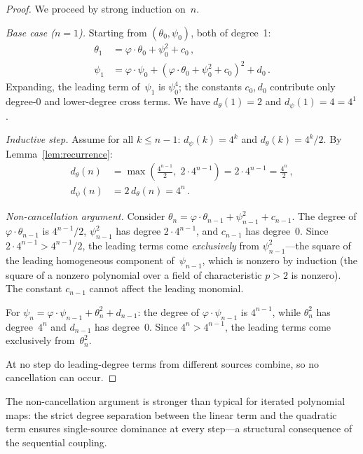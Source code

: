 \documentclass[11pt,a4paper]{article}
\theoremstyle{definition}
\begin{document}
\begin{proof}
We proceed by strong induction on~$n$.

\emph{Base case ($n=1$).} Starting from $(\theta_0, \psi_0)$, both of
degree~1:
\begin{align*}
  \theta_1 &= \varphi\cdot\theta_0 + \psi_0^2 + c_0\,,\\
  \psi_1   &= \varphi\cdot\psi_0 + (\varphi\cdot\theta_0 + \psi_0^2 + c_0)^2 + d_0\,.
\end{align*}
Expanding, the leading term of~$\psi_1$ is $\psi_0^4$; the constants
$c_0, d_0$ contribute only degree-0 and lower-degree cross terms.
We have $d_\theta(1) = 2$ and $d_\psi(1) = 4 = 4^1$.

\emph{Inductive step.} Assume for all $k \le n-1$: $d_\psi(k) = 4^k$ and
$d_\theta(k) = 4^k/2$. By Lemma~\ref{lem:recurrence}:
\begin{align*}
  d_\theta(n) &= \max\!\left(\tfrac{4^{n-1}}{2},\; 2\cdot 4^{n-1}\right)
               = 2\cdot 4^{n-1} = \tfrac{4^n}{2}\,,\\
  d_\psi(n)   &= 2\,d_\theta(n) = 4^n\,.
\end{align*}

\emph{Non-cancellation argument.} Consider
$\theta_n = \varphi\cdot\theta_{n-1} + \psi_{n-1}^2 + c_{n-1}$. The degree of
$\varphi\cdot\theta_{n-1}$ is $4^{n-1}/2$, $\psi_{n-1}^2$ has degree
$2\cdot 4^{n-1}$, and $c_{n-1}$ has degree~0.
Since $2\cdot 4^{n-1} > 4^{n-1}/2$, the leading terms
come \emph{exclusively} from $\psi_{n-1}^2$---the square of the leading
homogeneous component of~$\psi_{n-1}$, which is nonzero by induction (the
square of a nonzero polynomial over a field of characteristic $p > 2$ is
nonzero). The constant $c_{n-1}$ cannot affect the leading monomial.

For $\psi_n = \varphi\cdot\psi_{n-1} + \theta_n^2 + d_{n-1}$: the degree of
$\varphi\cdot\psi_{n-1}$ is $4^{n-1}$, while $\theta_n^2$ has degree~$4^n$
and $d_{n-1}$ has degree~0.
Since $4^n > 4^{n-1}$, the leading terms come exclusively from~$\theta_n^2$.

At no step do leading-degree terms from different sources combine, so no
cancellation can occur.
\end{proof}

The non-cancellation argument is stronger than typical for iterated
polynomial maps: the strict degree separation between the linear term
and the quadratic term ensures single-source dominance at every
step---a structural consequence of the sequential coupling.
\end{document}
